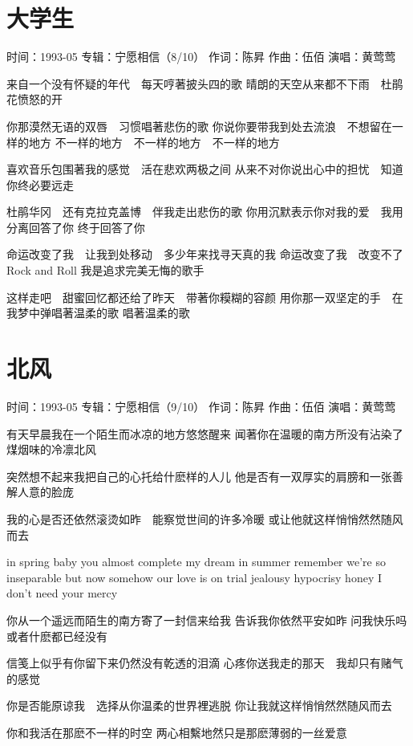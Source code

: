 \documentclass[UTF8,a4paper,oneside,twocolumn,12pt]{ctexbook}
\newcommand{\infopair}[2]{\textbullet #1：#2}
\newcommand{\zc}[1][伍佰]{\infopair{作词}{#1}}
\newcommand{\zq}[1][伍佰]{\infopair{作曲}{#1}}
\newcommand{\zj}[1]{\infopair{专辑}{#1}}
\newcommand{\sj}[1]{\infopair{时间}{#1}}
\newenvironment{info}{\begin{flushleft}\kaishu
	}
	{\end{flushleft}\normalsize\yahei\par}
\newenvironment{lyric}{
	}
{}
\begin{document}
\section{大学生}
\begin{info}%
	\sj{1993-05}
	\zj{宁愿相信（8/10）}
	\zc[陈昇]
	\zq
	\infopair{演唱}{黄莺莺}
\end{info}
\begin{lyric}
	来自一个没有怀疑的年代　每天哼著披头四的歌
	晴朗的天空从来都不下雨　杜鹃花愤怒的开

	你那漠然无语的双唇　习惯唱著悲伤的歌
	你说你要带我到处去流浪　不想留在一样的地方
	不一样的地方　不一样的地方　不一样的地方

	喜欢音乐包围著我的感觉　活在悲欢两极之间
	从来不对你说出心中的担忧　知道你终必要远走

	杜鹃华冈　还有克拉克盖博　伴我走出悲伤的歌
	你用沉默表示你对我的爱　我用分离回答了你
	终于回答了你

	命运改变了我　让我到处移动　多少年来找寻天真的我
	命运改变了我　改变不了Rock and Roll
	我是追求完美无悔的歌手

	这样走吧　甜蜜回忆都还给了昨天　带著你糢糊的容颜
	用你那一双坚定的手　在我梦中弹唱著温柔的歌
	唱著温柔的歌
\end{lyric}

\section{北风}
\begin{info}%
	\sj{1993-05}
	\zj{宁愿相信（9/10）}
	\zc[陈昇]
	\zq
	\infopair{演唱}{黄莺莺}
\end{info}
\begin{lyric}
	有天早晨我在一个陌生而冰凉的地方悠悠醒来
	闻著你在温暖的南方所没有沾染了煤烟味的冷凛北风

	突然想不起来我把自己的心托给什麽样的人儿
	他是否有一双厚实的肩膀和一张善解人意的脸庞

	我的心是否还依然滚烫如昨　能察觉世间的许多冷暖
	或让他就这样悄悄然然随风而去

	in spring baby
	you almost complete my dream
	in summer remember
	we're so inseparable
	but now somehow
	our love is on trial
	jealousy hypocrisy
	honey I don't need your mercy

	你从一个遥远而陌生的南方寄了一封信来给我
	告诉我你依然平安如昨
	问我快乐吗　或者什麽都已经没有

	信笺上似乎有你留下来仍然没有乾透的泪滴
	心疼你送我走的那天　我却只有赌气的感觉

	你是否能原谅我　选择从你温柔的世界裡逃脱
	你让我就这样悄悄然然随风而去

	你和我活在那麽不一样的时空
	两心相繫地然只是那麽薄弱的一丝爱意
\end{lyric}
\end{document}
